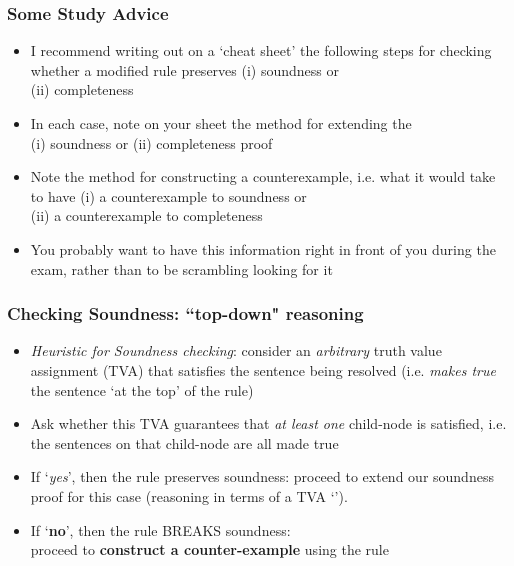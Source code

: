 \begin{frame}
\frametitle{Some Study Advice}

\begin{itemize}[<+->]

\item I recommend writing out on a `cheat sheet' the following steps for checking whether a modified rule preserves (i) soundness or \\ (ii) completeness

\item In each case, note on your sheet the method for extending the \\ (i) soundness or (ii) completeness proof

\item Note the method for constructing a counterexample, i.e. what it would take to have (i) a counterexample to soundness or \\ (ii) a counterexample to completeness

\item You probably want to have this information right in front of you during the exam, rather than to be scrambling looking for it


\end{itemize}
\end{frame}

\begin{frame}
\frametitle{Checking Soundness: ``top-down" reasoning}

\begin{itemize}[<+->]

\item \emph{Heuristic for Soundness checking}: consider an \emph{arbitrary} truth value assignment (TVA) that satisfies the sentence being resolved (i.e. \textit{makes true} the sentence `at the top' of the rule)

\item Ask whether this TVA guarantees that \emph{at least one} child-node is satisfied, i.e. the sentences on that child-node are all made true

\item If `\emph{yes}', then the rule preserves soundness: proceed to extend our soundness proof for this case (reasoning in terms of a TVA `'). 

\item If `\textbf{\textcolor{OGlyallpink}{no}}', then the rule BREAKS soundness: \\ proceed to \textbf{\textcolor{OGlyallpink}{construct a counter-example}} using the rule 

\end{itemize}
\end{frame}

